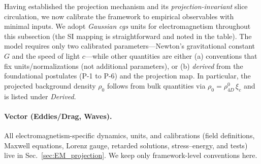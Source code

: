 Having established the projection mechanism and its \emph{projection-invariant} slice circulation, we now calibrate the framework to empirical observables with minimal inputs. We adopt \emph{Gaussian cgs} units for electromagnetism throughout this subsection (the SI mapping is straightforward and noted in the table). The model requires only two calibrated parameters---Newton's gravitational constant $G$ and the speed of light $c$---while other quantities are either (a) conventions that fix units/normalizations (not additional parameters), or (b) \emph{derived} from the foundational postulates (P-1 to P-6) and the projection map. In particular, the projected background density $\rho_0$ follows from bulk quantities via $\rho_0=\rho_{4D}^0\,\xi_c$ and is listed under \emph{Derived}.

\paragraph{Vector (Eddies/Drag, Waves).}
All electromagnetism-specific dynamics, units, and calibrations (field definitions, Maxwell equations, Lorenz gauge, retarded solutions, stress–energy, and tests) live in Sec.~\ref{sec:EM_projection}. We keep only framework-level conventions here.

\medskip

